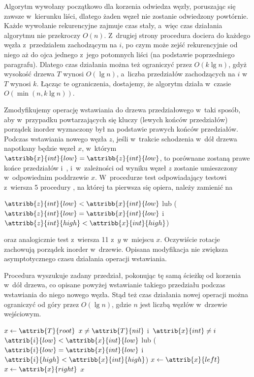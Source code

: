 Algorytm wywołany początkowo dla korzenia odwiedza węzły, poruszając się zawsze w~kierunku liści, dlatego żaden węzeł nie zostanie odwiedzony powtórnie.
Każde wywołanie rekurencyjne zajmuje czas stały, a~więc czas działania algorytmu nie przekroczy $O(n)$.
Z~drugiej strony procedura dociera do każdego węzła z~przedziałem zachodzącym na $i$, po czym może zejść rekurencyjnie od niego aż do ojca jednego z~jego potomnych liści (na podstawie poprzedniego paragrafu).
Dlatego czas działania można też ograniczyć przez $O(k\lg n)$, gdyż wysokość drzewa $T$ wynosi $O(\lg n)$, a~liczba przedziałów zachodzących na $i$ w~$T$ wynosi $k$.
Łącząc te ograniczenia, dostajemy, że algorytm działa w~czasie $O(\min(n,k\lg n))$.

\exercise %
Zmodyfikujemy operację wstawiania do drzewa przedziałowego w~taki sposób, aby w~przypadku powtarzających się kluczy (lewych końców przedziałów) porządek inorder wyznaczony był na podstawie prawych końców przedziałów.
Podczas wstawiania nowego węzła $z$, jeśli w~trakcie schodzenia w~dół drzewa napotkany będzie węzeł $x$, w~którym $\attribb{x}{int}{low}=\attribb{z}{int}{low}$, to porównane zostaną prawe końce przedziałów  i~, i~w~zależności od wyniku węzeł $z$ zostanie umieszczony w~odpowiednim poddrzewie $x$.
W~procedurze  test odpowiadający testowi z~wiersza 5 procedury , na której ta pierwsza się opiera, należy zamienić na
\begin{codebox}
\zi \If $\attribb{z}{int}{low}<\attribb{x}{int}{low}$ lub ($\attribb{z}{int}{low}=\attribb{x}{int}{low}$ i~$\attribb{z}{int}{high}<\attribb{x}{int}{high}$)
\end{codebox}
oraz analogicznie test z~wiersza 11 z~$y$ w~miejscu $x$.
Oczywiście rotacje zachowują porządek inorder w~drzewie.
Opisana modyfikacja nie zwiększa asymptotycznego czasu działania operacji wstawiania.

Procedura  wyszukuje zadany przedział, pokonując tę samą ścieżkę od korzenia w~dół drzewa, co opisane powyżej wstawianie takiego przedziału podczas wstawiania do niego nowego węzła.
Stąd też czas działania nowej operacji można ograniczyć od góry przez $O(\lg n)$, gdzie $n$ jest liczbą węzłów w~drzewie wejściowym.
\begin{codebox}
\li	$x\gets\attrib{T}{root}$
\li	\While $x\ne\attrib{T}{nil}$ i~$\attrib{x}{int}\ne i$
\li		\Do \If $\attrib{i}{low}<\attribb{x}{int}{low}$ lub ($\attrib{i}{low}=\attribb{x}{int}{low}$ i~$\attrib{i}{high}<\attribb{x}{int}{high}$)
\li				\Then $x\gets\attrib{x}{left}$
\li				\Else $x\gets\attrib{x}{right}$
				\End
		\End
\li	\Return $x$
\end{codebox}

